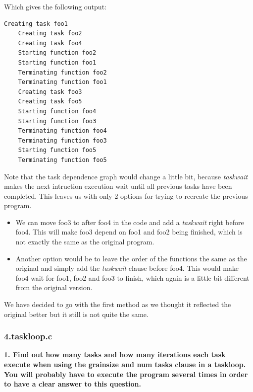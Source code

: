 \documentclass[12]{article}
\begin{document}
Which gives the following output:

\begin{lstlisting}[frame=single]
    Creating task foo1
    Creating task foo2
    Creating task foo4
    Starting function foo2
    Starting function foo1
    Terminating function foo2
    Terminating function foo1
    Creating task foo3
    Creating task foo5
    Starting function foo4
    Starting function foo3
    Terminating function foo4
    Terminating function foo3
    Starting function foo5
    Terminating function foo5
\end{lstlisting}

Note that the task dependence graph would change a little bit, because \textit{taskwait} makes the next intruction execution wait until all previous tasks have been completed. This leaves us with only 2 options for trying to recreate the previous program.

\begin{itemize}
    \item We can move foo3 to after foo4 in the code and add a \textit{taskwait} right before foo4. This will make foo3 depend on foo1 and foo2 being finished, which is not exactly the same as the original program.
    \item Another option would be to leave the order of the functions the same as the original and simply add the \textit{taskwait} clause before foo4. This would make foo4 wait for foo1, foo2 and foo3 to finish, which again is a little bit different from the original version.
\end{itemize}

We have decided to go with the first method as we thought it reflected the original better but it still is not quite the same.


\subsubsection{4.taskloop.c}
\textbf{1. Find out how many tasks and how many iterations each task execute when using the grainsize
and num tasks clause in a taskloop. You will probably have to execute the program several times in order to have a clear answer to this question.}
\end{document}
